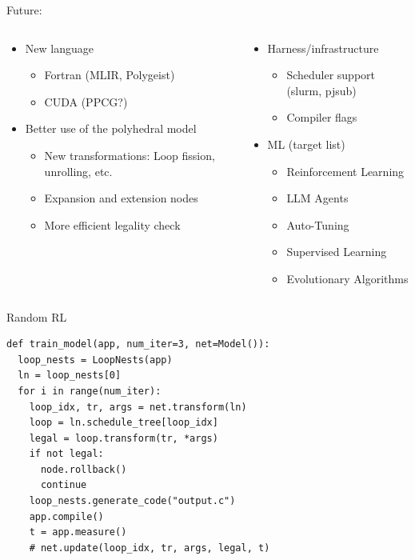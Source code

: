 \documentclass[presentation, aspectratio=169]{beamer}
\begin{document}
\begin{frame}[label={sec:org9171e94}]{Future:}
\begin{columns}
\begin{column}{0.48\columnwidth}
\begin{itemize}
\item New language
\begin{itemize}
\item Fortran (MLIR, Polygeist)
\item CUDA (PPCG?)
\end{itemize}
\item Better use of the polyhedral model
\begin{itemize}
\item New transformations: Loop fission, unrolling, etc.
\item Expansion and extension nodes
\item More efficient legality check
\end{itemize}
\end{itemize}
\end{column}
\begin{column}{0.48\columnwidth}
\begin{itemize}
\item Harness/infrastructure
\begin{itemize}
\item Scheduler support (slurm, pjsub)
\item Compiler flags
\end{itemize}
\item ML (target list)
\begin{itemize}
\item Reinforcement Learning
\item LLM Agents
\item Auto-Tuning
\item Supervised Learning
\item Evolutionary Algorithms
\end{itemize}
\end{itemize}
\end{column}
\end{columns}
\end{frame}
\begin{frame}[label={sec:orgf2a8db6},fragile]{Random RL}
 \begin{verbatim}
def train_model(app, num_iter=3, net=Model()):
  loop_nests = LoopNests(app)
  ln = loop_nests[0]
  for i in range(num_iter):
    loop_idx, tr, args = net.transform(ln)
    loop = ln.schedule_tree[loop_idx]
    legal = loop.transform(tr, *args)
    if not legal:
      node.rollback()
      continue
    loop_nests.generate_code("output.c")
    app.compile()
    t = app.measure()
    # net.update(loop_idx, tr, args, legal, t)
\end{verbatim}
\end{frame}
\end{document}
